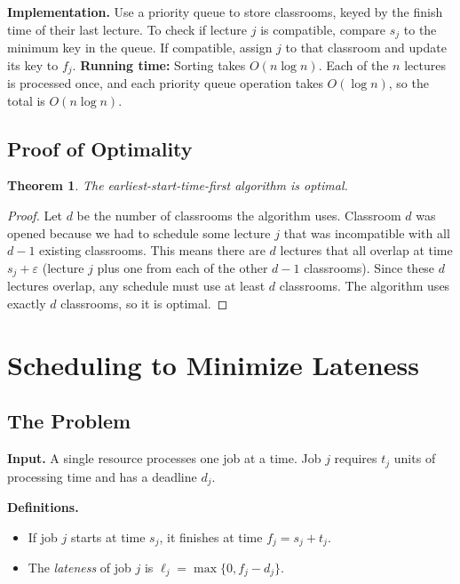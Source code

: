 \documentclass[12pt,a4paper]{report}
\newtheorem{theorem}{Theorem}
\begin{document}
\textbf{Implementation.} Use a priority queue to store classrooms, keyed by the finish time of their
last lecture. To check if lecture $j$ is compatible, compare $s_j$ to the minimum key in the queue.
If compatible, assign $j$ to that classroom and update its key to $f_j$. 
\newline
\textbf{Running time:} Sorting takes $O(n \log n)$. Each of the $n$ lectures is processed once, and each priority queue operation takes $O(\log n)$, so the total is $O(n \log n)$.


\subsection{Proof of Optimality}

\begin{theorem}
The earliest-start-time-first algorithm is optimal.
\end{theorem}

\begin{proof}
Let $d$ be the number of classrooms the algorithm uses. Classroom $d$ was opened because we had
to schedule some lecture $j$ that was incompatible with all $d-1$ existing classrooms. This means
there are $d$ lectures that all overlap at time $s_j + \varepsilon$ (lecture $j$ plus one from
each of the other $d-1$ classrooms). Since these $d$ lectures overlap, any schedule must use at
least $d$ classrooms. The algorithm uses exactly $d$ classrooms, so it is optimal.
\end{proof}

\newpage
\section{Scheduling to Minimize Lateness}

\subsection{The Problem}

\textbf{Input.} A single resource processes one job at a time. Job $j$ requires $t_j$ units of
processing time and has a deadline $d_j$.

\textbf{Definitions.}
\begin{itemize}
    \item If job $j$ starts at time $s_j$, it finishes at time $f_j = s_j + t_j$.
    \item The \emph{lateness} of job $j$ is $\ell_j = \max\{0, f_j - d_j\}$.
\end{itemize}
\end{document}
